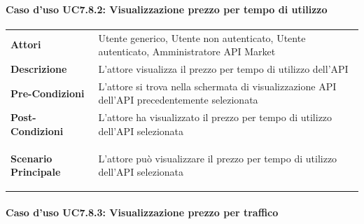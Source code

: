 \paragraph{Caso d'uso UC7.8.2: Visualizzazione prezzo per tempo di utilizzo}
\label{UC7_8_2}

\begin{minipage}{\linewidth}
	\begin{tabular}{ l | p{11cm}}
		\hline
		\rowcolor{Gray}
		\multicolumn{2}{c}{UC7.8.2 - Visualizzazione prezzo per tempo di utilizzo} \\
		\hline
		\textbf{Attori} & Utente generico, Utente non autenticato, Utente autenticato, Amministratore API Market \\
		\textbf{Descrizione} & L'attore visualizza il prezzo per tempo di utilizzo dell'API \\
		\textbf{Pre-Condizioni} & L'attore si trova nella schermata di visualizzazione API dell'API precedentemente selezionata \\
		\textbf{Post-Condizioni} & L'attore ha visualizzato il prezzo per tempo di utilizzo dell'API selezionata \\
		\textbf{Scenario Principale} & 
		\begin{enumerate*}[label=(\arabic*.),itemjoin={\newline}]
			\item L'attore può visualizzare il prezzo per tempo di utilizzo dell'API selezionata
		\end{enumerate*}\\
	\end{tabular}
\end{minipage}

\paragraph{Caso d'uso UC7.8.3: Visualizzazione prezzo per traffico}
\label{UC7_8_3}

